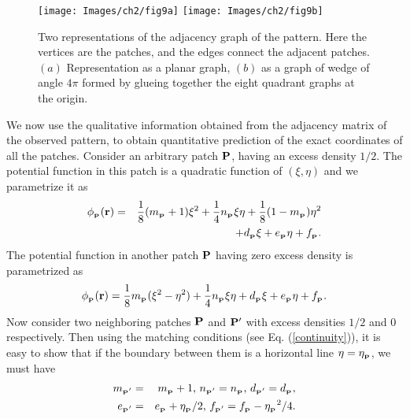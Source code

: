 \documentclass[11pt,a4paper]{book}
\def\p{{_{\bf P}}}
\begin{document}
\begin{figure}
\begin{center}
    \texttt{[image: Images/ch2/fig9a]}    
    \texttt{[image: Images/ch2/fig9b]} 
    \caption{Two representations of the adjacency graph of the pattern. 
    Here the vertices are the patches, and the edges connect the adjacent
    patches.
    $(a)$ Representation as a planar graph, $(b)$ as a graph of wedge of angle 
    $4 \pi$ formed by glueing together the eight quadrant graphs at the
    origin.}
    \label{fig5}
\end{center}
\end{figure}

We now use the qualitative information obtained from the adjacency 
matrix of the observed pattern, to obtain quantitative prediction of the 
exact coordinates of all the patches. Consider an arbitrary patch ${\bf P}$, 
having an excess density $1/2$. The potential function in this patch is a 
quadratic function of $(\xi,\eta)$ and we parametrize it as
\begin{eqnarray}
\phi_\p(\mathbf{r}) &=& \frac{1}{8}(m_\p+1)\xi^2 + \frac{1}{4}n_\p\xi\eta
+\frac{1}{8}(1-m_\p)\eta^2 \nonumber \\
&&+ d_\p\xi + e_\p \eta + f_\p.
\label{eq:odd}
\end{eqnarray}
The potential function in another patch ${\bf P}$ having zero excess density 
is parametrized as
\begin{equation}
\phi_\p(\mathbf{r})=\frac{1}{8}m_\p(\xi^2-\eta^2) + \frac{1}{4}n_\p\xi\eta
 + d_\p\xi + e_\p\eta + f_\p.
\label{eq:even}
\end{equation}
Now consider two neighboring patches ${\bf P}$ and ${\bf P'}$ with   
excess densities  $1/2$ and $0$ respectively. Then using the matching 
conditions (see Eq. (\ref{continuity})), it  is easy to show that if the boundary between  them 
is a horizontal line $\eta =\eta_{\p}$, we must have 
\begin{eqnarray}
m_{\p'} &=& m_\p+1 \textrm{,   }n_{\p'} = n_\p \textrm{,   } d_{\p'} = d_\p,
\nonumber \\
e_{\p'} &=& e_\p + \eta_\p/2 \textrm{,   } f_{\p'} = f_\p - {\eta_\p}^2/4.
\label{a2}
\end{eqnarray}
\end{document}
